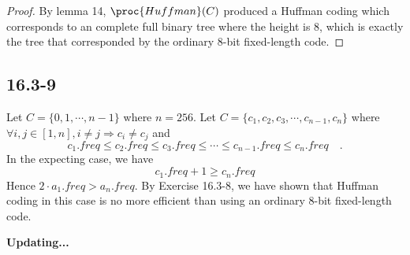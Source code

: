 \begin{proof}
    By lemma 14, $\proc{Huffman}(C)$ produced a Huffman coding 
    which corresponds to an complete full binary tree where the height is $8$,
    which is exactly the tree that corresponded by the ordinary 8-bit fixed-length code.
\end{proof}

\subsection*{16.3-9}


Let $C = \{ 0, 1, \cdots, n - 1 \}$ where $n = 256$.
Let $C = \{ c_1, c_2, c_3, \cdots, c_{n-1}, c_n \}$
where $\forall i,j \in [1,n], i \neq j \Longrightarrow c_i \neq c_j$
and
\begin{equation*}
    c_1.freq \leq c_2.freq \leq c_3.freq \leq 
    \cdots \leq c_{n-1}.freq \leq c_n.freq
    \quad .
\end{equation*}
In the expecting case, we have
\begin{equation*}
    c_1.freq + 1 \geq c_n.freq
\end{equation*}
Hence $2 \cdot a_1.freq > a_n.freq$.
By Exercise 16.3-8, we have shown that 
Huffman coding in this case is no more efficient than
using an ordinary 8-bit fixed-length code.




\centerline{\textbf{Updating...}}

